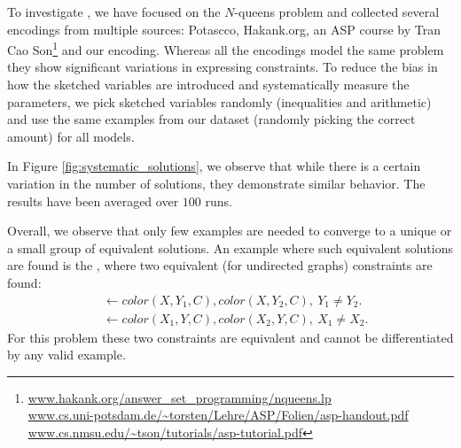 

To investigate \qfive, we have focused on the $N$-queens problem and collected several encodings from multiple sources: Potascco, Hakank.org, an ASP course by Tran Cao Son\footnote{\url{www.hakank.org/answer_set_programming/nqueens.lp}\\\url{www.cs.uni-potsdam.de/~torsten/Lehre/ASP/Folien/asp-handout.pdf}\\\url{www.cs.nmsu.edu/~tson/tutorials/asp-tutorial.pdf}} and our encoding. 
Whereas all the encodings model the same problem they show significant variations 
in  expressing constraints. To reduce the bias in how the sketched variables are introduced and systematically measure the parameters, we pick sketched variables randomly (inequalities and arithmetic) and use the same examples from our dataset (randomly picking the correct amount) for all models.

In Figure \ref{fig:systematic_solutions}, we observe that while there is a certain variation in the number of solutions, they demonstrate similar behavior.   The results have been averaged over $100$ runs.


Overall, we observe that only few examples are needed to converge to a unique or a small group of equivalent solutions. An example where such equivalent solutions are found is the , where two equivalent (for undirected graphs) constraints are found:
\begin{equation*}
  \begin{aligned}
    &\leftarrow \textit{color}(X,Y_1,C), \textit{color}(X,Y_2,C),~Y_1 \neq Y_2.\\
    &\leftarrow \textit{color}(X_1,Y,C), \textit{color}(X_2,Y,C),~X_1 \neq X_2.
  \end{aligned}
\end{equation*}
For this problem these two constraints are equivalent and cannot be differentiated by any valid example. %



